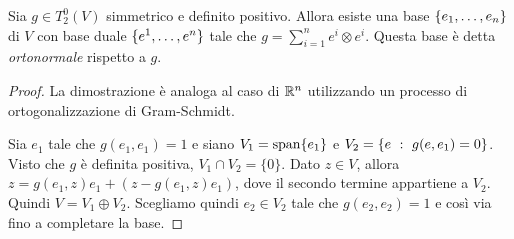 \begin{proposition}  \label{prop:EsistenzaBaseOrtonormale}
	Sia $g\in T^0_2(V)$ simmetrico e definito positivo. Allora esiste una base $\{\seqb en,\}$ di $V$ con base duale $\{\seqa en,\}$ tale che $g = \sum_{i=1}^n e^i\otimes e^i$. Questa base è detta \emph{ortonormale} rispetto a $g$.
\end{proposition}
\begin{proof}
	La dimostrazione è analoga al caso di $\R^n$ utilizzando un processo di ortogonalizzazione di Gram-Schmidt.
	
	Sia $e_1$ tale che $g(e_1,e_1) = 1$ e siano $V_1 = \spanrm \{e_1\}$ e $V_2 = \{e \suchthat g(e,e_1) = 0\}$.
	Visto che $g$ è definita positiva, $V_1\cap V_2= \{0\}$. Dato $z\in V$, allora $z = g(e_1,z)e_1 + (z-g(e_1,z)e_1)$, dove il secondo termine appartiene a $V_2$. Quindi $V = V_1\oplus V_2$.
	Scegliamo quindi $e_2\in V_2$ tale che $g(e_2,e_2)=1$ e così via fino a completare la base.
\end{proof}


